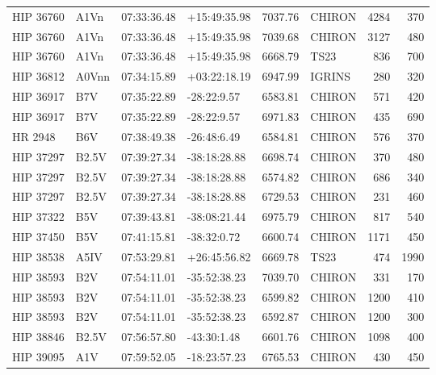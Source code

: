 \documentclass{emulateapj}
\begin{document}
\begin{longtable*}{|l|lllrlrr|}
   HIP 36760 &           A1Vn &    07:33:36.48 &   +15:49:35.98 &  7037.76 &     CHIRON &     4284 &     370 \\
   HIP 36760 &           A1Vn &    07:33:36.48 &   +15:49:35.98 &  7039.68 &     CHIRON &     3127 &     480 \\
   HIP 36760 &           A1Vn &    07:33:36.48 &   +15:49:35.98 &  6668.79 &       TS23 &      836 &     700 \\
   HIP 36812 &          A0Vnn &    07:34:15.89 &   +03:22:18.19 &  6947.99 &     IGRINS &      280 &     320 \\
   HIP 36917 &            B7V &    07:35:22.89 &    -28:22:9.57 &  6583.81 &     CHIRON &      571 &     420 \\
   HIP 36917 &            B7V &    07:35:22.89 &    -28:22:9.57 &  6971.83 &     CHIRON &      435 &     690 \\
     HR 2948 &            B6V &    07:38:49.38 &    -26:48:6.49 &  6584.81 &     CHIRON &      576 &     370 \\
   HIP 37297 &          B2.5V &    07:39:27.34 &   -38:18:28.88 &  6698.74 &     CHIRON &      370 &     480 \\
   HIP 37297 &          B2.5V &    07:39:27.34 &   -38:18:28.88 &  6574.82 &     CHIRON &      686 &     340 \\
   HIP 37297 &          B2.5V &    07:39:27.34 &   -38:18:28.88 &  6729.53 &     CHIRON &      231 &     460 \\
   HIP 37322 &            B5V &    07:39:43.81 &   -38:08:21.44 &  6975.79 &     CHIRON &      817 &     540 \\
   HIP 37450 &            B5V &    07:41:15.81 &    -38:32:0.72 &  6600.74 &     CHIRON &     1171 &     450 \\
   HIP 38538 &           A5IV &    07:53:29.81 &   +26:45:56.82 &  6669.78 &       TS23 &      474 &    1990 \\
   HIP 38593 &            B2V &    07:54:11.01 &   -35:52:38.23 &  7039.70 &     CHIRON &      331 &     170 \\
   HIP 38593 &            B2V &    07:54:11.01 &   -35:52:38.23 &  6599.82 &     CHIRON &     1200 &     410 \\
   HIP 38593 &            B2V &    07:54:11.01 &   -35:52:38.23 &  6592.87 &     CHIRON &     1200 &     300 \\
   HIP 38846 &          B2.5V &    07:56:57.80 &    -43:30:1.48 &  6601.76 &     CHIRON &     1098 &     400 \\
   HIP 39095 &            A1V &    07:59:52.05 &   -18:23:57.23 &  6765.53 &     CHIRON &      430 &     450 \\

\end{longtable*}
\end{document}

